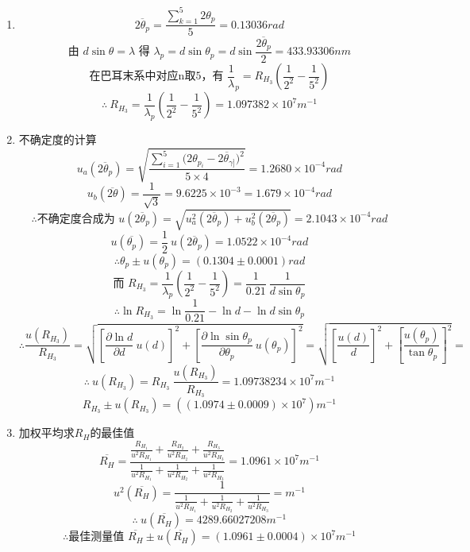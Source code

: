 \documentclass[11pt,a4paper,oneside]{article}
\begin{document}
\begin{enumerate}
  \item { }
      $$\overline{2{\theta}_p} = \displaystyle\frac{\sum_{k=1}^5 2{\theta}_p}{5} = 0.13036rad$$
      $$\displaystyle\text{由\ }d\sin{\theta} = {\lambda}\text{\ 得\ }{\lambda}_p = d\sin{\theta}_p = d\sin{\frac{\overline{2{\theta}_p}}{2}} = 433.93306nm$$
      $$\displaystyle\text{在巴耳末系中对应n取5，有\ }\frac{1}{\lambda}_p = R_{H_3}\left(\frac{1}{2^2}-\frac{1}{5^2}\right)$$
      $$\therefore\ \displaystyle R_{H_3} = \frac{1}{ {\lambda}_p}\left(\frac{1}{2^2}-\frac{1}{5^2}\right) = 1.097382{\times}10^{7}m^{-1}$$
  \item {不确定度的计算}
      $$u_a(\overline{2{\theta}_p}) = \displaystyle\sqrt{\frac{\sum_{i=1}^5{(2{\theta}_{p_{i}}-\overline{2{\theta}_{\gamma]}}})^2}{5\times4}}=1.2680{\times}10^{-4} rad$$
      $$u_b(\overline{2\theta}) = \displaystyle\frac{1}{\sqrt3} = 9.6225\times10^{-3} = 1.679 \times 10^{-4} rad$$
      $$\therefore\text{不确定度合成为\ }u(\overline{2{\theta}_p}) = \sqrt{u_a^2(\overline{2{\theta}_p})+u_b^2(\overline{2{\theta}_p})} = 2.1043{\times}10^{-4}rad$$
      $$u(\overline{ {\theta}_p})= \displaystyle\frac12\ u(\overline{2{\theta}_p}) = 1.0522{\times}10^{-4}rad$$
      $$\therefore{\theta}_p \pm u({\theta}_p) = (0.1304\pm0.0001)rad$$
      $$\text{而\ }\displaystyle R_{H_3} = \frac{1}{ {\lambda}_p}\left(\frac{1}{2^2}-\frac{1}{5^2}\right) = \frac{1}{0.21}\ \frac{1}{d\sin{\theta}_p}$$
      $$\therefore\ln{R_{H_3}} = \ln{\frac{1}{0.21}} -\ln{d} - \ln{d\sin{\theta}_p}$$
      $$\therefore\displaystyle \frac{u(R_{H_3})}{R_{H_3}} = \sqrt{ {\left[\frac{\partial{\ln{d}}}{\partial{d}}\ u(d)\right]}^2 + {\left[\frac{\partial{\ln{\sin{ {\theta}_p}}}}{\partial{ {\theta}_p}}\ u({\theta}_p)\right]}^2} = \sqrt{ {\left[\frac{u(d)}{d}\right]}^2 + {\left[\frac{u({\theta}_p)}{\tan{ {\theta}_p}}\right]}^2} = $$
      $$\therefore \ u(R_{H_3}) = \displaystyle R_{H_3}\ \frac{u(R_{H_3})}{R_{H_3}} = 1.09738234{\times}10^{7}m^{-1}$$ 
      $$R_{H_3} \pm u(R_{H_3}) = ((1.0974\pm0.0009){\times}10^{7})m^{-1}$$
  \item{加权平均求$R_H$的最佳值}
      $$\overline{R_H} = \displaystyle\frac{\frac{R_{H_1}}{u^2{R_{H_1}}}+\frac{R_{H_2}}{u^2{R_{H_2}}}+\frac{R_{H_3}}{u^2{R_{H_3}}}}{\frac{1}{u^2{R_{H_1}}}+\frac{1}{u^2{R_{H_2}}}+\frac{1}{u^2{R_{H_3}}}} = 1.0961{\times}10^{7}m^{-1}$$
      $$u^2(\overline{R_H}) = \displaystyle\frac{1}{\frac{1}{u^2{R_{H_1}}}+\frac{1}{u^2{R_{H_2}}}+\frac{1}{u^2{R_{H_3}}}} = m^{-1}$$
      $$\therefore \ u(\overline{R_H}) = 4289.66027208m^{-1} $$
      $$\therefore\text{最佳测量值 \ } \overline{R_H} \pm u(\overline{R_H}) = (1.0961\pm0.0004){\times}10^{7} m^{-1}$$   
\end{enumerate}
\end{document}
